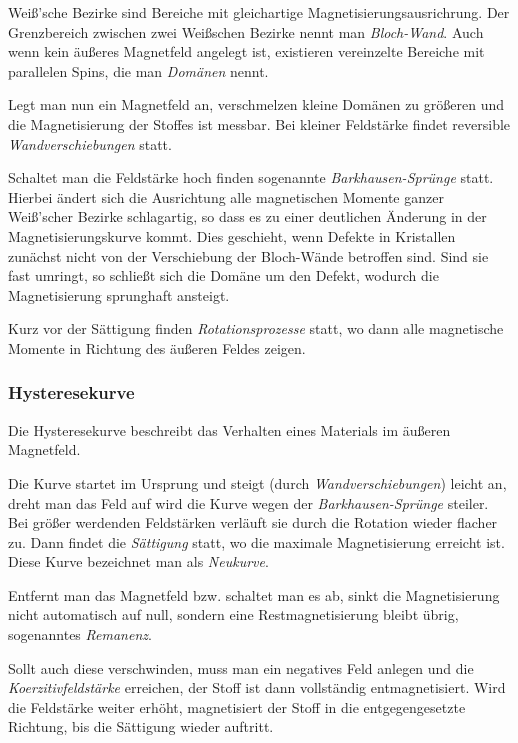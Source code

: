 \documentclass[12pt,a4paper]{scrartcl}
\numberwithin{equation}{section} %
\renewcommand{\[}{} %
\renewcommand{\]}{\noindent} %
\begin{document}
Weiß'sche Bezirke sind Bereiche mit gleichartige
Magnetisierungsausrichrung. Der Grenzbereich zwischen zwei Weißschen
Bezirke nennt man \emph{Bloch-Wand}. Auch wenn kein äußeres Magnetfeld
angelegt ist, existieren vereinzelte Bereiche mit parallelen Spins, die
man \emph{Domänen} nennt.

Legt man nun ein Magnetfeld an, verschmelzen kleine Domänen zu größeren
und die Magnetisierung der Stoffes ist messbar. Bei kleiner Feldstärke
findet reversible \emph{Wandverschiebungen} statt.

Schaltet man die Feldstärke hoch finden sogenannte
\emph{Barkhausen-Sprünge} statt. Hierbei ändert sich die Ausrichtung
alle magnetischen Momente ganzer Weiß'scher Bezirke schlagartig, so dass
es zu einer deutlichen Änderung in der Magnetisierungskurve kommt. Dies
geschieht, wenn Defekte in Kristallen zunächst nicht von der
Verschiebung der Bloch-Wände betroffen sind. Sind sie fast umringt, so
schließt sich die Domäne um den Defekt, wodurch die Magnetisierung
sprunghaft ansteigt.

Kurz vor der Sättigung finden \emph{Rotationsprozesse} statt, wo dann
alle magnetische Momente in Richtung des äußeren Feldes zeigen.

\hypertarget{hysteresekurve}{%
\subsubsection{Hysteresekurve}\label{hysteresekurve}}

Die Hysteresekurve beschreibt das Verhalten eines Materials im äußeren
Magnetfeld.

Die Kurve startet im Ursprung und steigt (durch
\emph{Wandverschiebungen}) leicht an, dreht man das Feld auf wird die
Kurve wegen der \emph{Barkhausen-Sprünge} steiler. Bei größer werdenden
Feldstärken verläuft sie durch die Rotation wieder flacher zu. Dann
findet die \emph{Sättigung} statt, wo die maximale Magnetisierung
erreicht ist. Diese Kurve bezeichnet man als \emph{Neukurve}.

Entfernt man das Magnetfeld bzw. schaltet man es ab, sinkt die
Magnetisierung nicht automatisch auf null, sondern eine
Restmagnetisierung bleibt übrig, sogenanntes \emph{Remanenz}.

Sollt auch diese verschwinden, muss man ein negatives Feld anlegen und
die \emph{Koerzitivfeldstärke} erreichen, der Stoff ist dann vollständig
entmagnetisiert. Wird die Feldstärke weiter erhöht, magnetisiert der
Stoff in die entgegengesetzte Richtung, bis die Sättigung wieder
auftritt.
\end{document}
